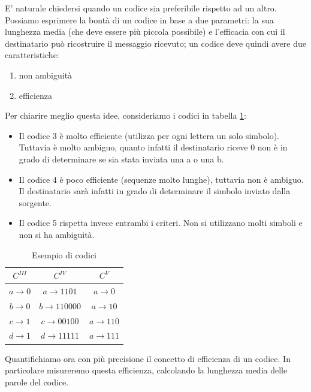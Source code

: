 E' naturale chiedersi quando un codice sia preferibile rispetto ad un altro.
Possiamo esprimere la bontà di un codice in base a due parametri: la sua lunghezza media (che deve essere più piccola possibile) e l'efficacia con cui il destinatario può ricostruire il messaggio ricevuto; un codice deve quindi avere due caratteristiche:
\begin{enumerate}
\item non ambiguità
\item efficienza
\end{enumerate}

Per chiarire meglio questa idee, consideriamo i codici in tabella \ref{tab:codici2}: 
\begin{itemize}
 \item Il codice 3 è molto efficiente (utilizza per ogni lettera un solo simbolo). Tuttavia è molto ambiguo, quanto infatti
 il destinatario riceve 0 non è in grado di determinare se sia stata inviata una a o una b.
 \item Il codice 4 è poco efficiente (sequenze molto lunghe), tuttavia non è ambiguo. Il destinatario sarà infatti in grado di 
determinare il simbolo inviato dalla sorgente.
 \item Il codice 5 rispetta invece entrambi i criteri. Non si utilizzano molti simboli e non si ha ambiguità.
\end{itemize}

\begin{table}[htbp]
  \begin{center}
   \begin{tabular}{c|c|c}
	$C^{III}$ & $C^{IV}$ & $C^{V}$\\
       \hline
	$a \to 0$ & $a \to 1101$ & $a \to 0$ \\ 
	$b \to 0$ & $b \to 110000$ & $a \to 10$ \\ 
	$c \to 1$ & $c \to 00100$ & $a \to 110$ \\ 
        $d \to 1$ & $d \to 11111$ & $a \to 111$ \\ 
    \end{tabular}
     
     \caption{Esempio di codici}
    \label{tab:codici2}
  \end{center}
\end{table}

Quantifichiamo ora con più precisione il concetto di efficienza di un codice.
In particolare misureremo questa efficienza, calcolando la lunghezza media delle parole del codice.

